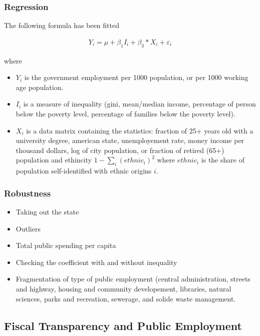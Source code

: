 \subsubsection{Regression}\label{regression}

The following formula has been fitted

\begin{align*}
    Y_{i} = \mu + \beta_1 I_i + \beta_3 * X_i + \varepsilon_i         
\end{align*}

where

\begin{itemize}
\itemsep1pt\parskip0pt
\item
  \(Y_i\) is the government employment per 1000 population, or per 1000
  working age population.
\item
  \(I_i\) is a measure of inequality (gini, mean/median income,
  percentage of person below the poverty level, percentage of families
  below the poverty level).
\item
  \(X_i\) is a data matrix containing the statistics: fraction of 25+
  years old with a university degree, american state, unemployement
  rate, money income per thousand dollars, log of city population, or
  fraction of retired (65+) population and ethincity
  \(1 - \sum_i (ethnic_i)^2\) where \(ethnic_i\) is the share of
  population self-identified with ethnic origins \(i\).
\end{itemize}

\subsubsection{Robustness}\label{robustness}

\begin{itemize}
\itemsep1pt\parskip0pt
\item
  Taking out the state
\item
  Outliers
\item
  Total public spending per capita
\item
  Checking the coefficient with and without inequality
\item
  Fragmentation of type of public employment (central administration,
  streets and highway, housing and community developement, libraries,
  natural sciences, parks and recreation, sewerage, and solide waste
  management.
\end{itemize}

\subsection{Fiscal Transparency and Public
Employment}\label{fiscal-transparency-and-public-employment}

